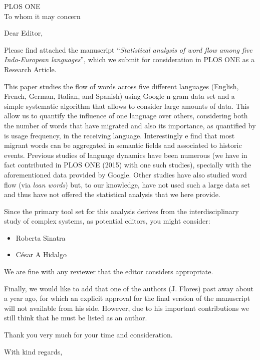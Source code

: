 \documentclass[11pt, addrfooterall ]{if_letter_2013}
\begin{document}
\begin{letter}{
PLOS ONE\\
To whom it may concern
}
\opening{Dear Editor,}

Please find attached the manuscript ``{\it Statistical analysis of word flow
among five Indo-European languages}'', which we submit for consideration in
PLOS ONE as a Research Article. 

This paper studies the flow of words across five different languages (English,
French, German, Italian, and Spanish) using Google n-gram data set and a simple
systematic algorithm that allows to consider large amounts of data.  This allow
us to quantify the influence of one language over others, considering both the
number of words that have migrated and also its importance, as quantified by is
usage frequency, in the receiving language.  Interestingly e find that most
migrant words can be aggregated in semantic fields and associated to historic
events.
Previous studies of language dynamics have been numerous (we have in fact 
contributed in PLOS ONE (2015) with one such studies), specially with the
aforementioned data provided by Google. Other studies have also studied 
word flow (via {\it loan words}) but, to our knowledge, have not used such a
large data set and thus have not offered the statistical analysis that
we here provide. 


Since the primary tool set for this analysis derives from the interdisciplinary
study of complex systems, as potential editors, you might consider:
\begin{itemize}
\item Roberta Sinatra
\item César A Hidalgo
\end{itemize}
We are fine with any reviewer that the editor considers appropriate.


Finally, we would like to add that one of the authors (J. Flores) past away
about a year ago, for which an explicit approval for the final version of the
manuscript will
not available from his side. However, due to his important contributions we still think that
he must be listed as an author. 

Thank you very much for your time and consideration.



% 

\closing{With kind regards,}

\end{letter}
\end{document}
